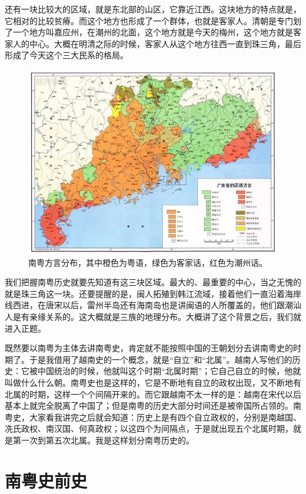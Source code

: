 还有一块比较大的区域，就是东北部的山区，它靠近江西。这块地方的特点就是，它相对的比较贫瘠。而这个地方也形成了一个群体，也就是客家人。清朝是专门划了一个地方叫嘉应州，在潮州的北面，这个地方就是今天的梅州，这个地方就是客家人的中心。大概在明清之际的时候，客家人从这个地方往西一直到珠三角，最后形成了今天这个三大民系的格局。

\begin{figure}
	\centering
	\includegraphics[width=\textwidth]{images/image-2}
	\caption{南粤方言分布，其中橙色为粤语，绿色为客家话，红色为潮州话。}
\end{figure}

我们把握南粤历史就要先知道有这三块区域。最大的、最重要的中心，当之无愧的就是珠三角这一块。还要提醒的是，闽人拓殖到韩江流域，接着他们一直沿着海岸线西进，在唐宋以后，雷州半岛还有海南岛也是讲闽语的人所覆盖的，他们跟潮汕人是有亲缘关系的。这大概就是三族的地理分布。大概讲了这个背景之后，我们就进入正题。

既然要以南粤为主体去讲南粤史，肯定就不能按照中国的王朝划分去讲南粤史的时期了。于是我借用了越南史的一个概念，就是“自立”和“北属”。越南人写他们的历史：它被中国统治的时候，他就叫这个时期“北属时期”；它自己自立的时候，他就叫做什么什么朝。南粤史也是这样的，它是不断地有自立的政权出现，又不断地有北属的时期，这样一个个间隔开来的。而它跟越南不太一样的是：越南在宋代以后基本上就完全脱离了中国了；但是南粤的历史大部分时间还是被帝国所占领的。南粤史，大家看我讲完之后就会知道：历史上是有四个自立政权的，分别是南越国、冼氏政权、南汉国、何真政权；以这四个为间隔点，于是就出现五个北属时期，就是第一次到第五次北属。我是这样划分南粤历史的。

\section{南粤史前史}


